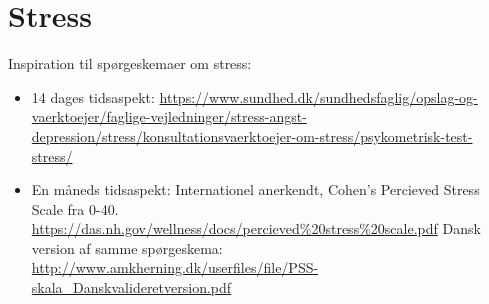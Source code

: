 \section{Stress}
Inspiration til spørgeskemaer om stress:
\begin{itemize}
    \item 14 dages tidsaspekt: \url{https://www.sundhed.dk/sundhedsfaglig/opslag-og-vaerktoejer/faglige-vejledninger/stress-angst-depression/stress/konsultationsvaerktoejer-om-stress/psykometrisk-test-stress/}
    \item En måneds tidsaspekt: Internationel anerkendt, Cohen's Percieved Stress Scale fra 0-40. \url{https://das.nh.gov/wellness/docs/percieved%20stress%20scale.pdf}
    Dansk version af samme spørgeskema: \url{http://www.amkherning.dk/userfiles/file/PSS-skala_Danskvalideretversion.pdf}
\end{itemize}

